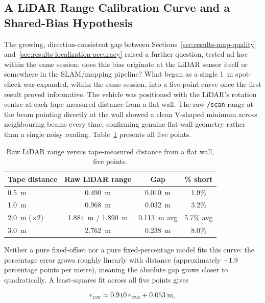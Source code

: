 \subsection{A LiDAR Range Calibration Curve and a Shared-Bias Hypothesis}
\label{sec:results-lidar-bias}

The growing, direction-consistent gap between Sections~\ref{sec:results-map-quality}
and~\ref{sec:results-localization-accuracy} raised a further question,
tested ad hoc within the same session: does this bias originate at the
LiDAR sensor itself or somewhere in the SLAM/mapping pipeline? What
began as a single \SI{1}{\meter} spot-check was expanded, within the
same session, into a five-point curve once the first result proved
informative. The vehicle was positioned with the LiDAR's rotation
centre at each tape-measured distance from a flat wall. The raw
\texttt{/scan} range at the beam pointing directly at the wall showed
a clean V-shaped minimum across neighbouring beams every time,
confirming genuine flat-wall geometry rather than a single noisy
reading. Table~\ref{tab:results-lidar-curve} presents all five points.

\begin{table}[htbp]
  \centering
  \caption{Raw LiDAR range versus tape-measured distance from a flat wall, five points.}
  \label{tab:results-lidar-curve}
  \begin{tabular}{@{}lccc@{}}
    \toprule
    Tape distance & Raw LiDAR range & Gap & \% short \\
    \midrule
    \SI{0.5}{\meter} & \SI{0.490}{\meter} & \SI{0.010}{\meter} & 1.9\% \\
    \SI{1.0}{\meter} & \SI{0.968}{\meter} & \SI{0.032}{\meter} & 3.2\% \\
    \SI{2.0}{\meter} ($\times 2$) & \SI{1.884}{\meter} / \SI{1.890}{\meter} & \SI{0.113}{\meter} avg & 5.7\% avg \\
    \SI{3.0}{\meter} & \SI{2.762}{\meter} & \SI{0.238}{\meter} & 8.0\% \\
    \bottomrule
  \end{tabular}
\end{table}

Neither a pure fixed-offset nor a pure fixed-percentage model fits
this curve: the percentage error grows roughly linearly with distance
(approximately $+1.9$ percentage points per metre), meaning the
absolute gap grows closer to quadratically. A least-squares fit across
all five points gives

\begin{equation}
  r_{\text{raw}} \approx 0.910 \, r_{\text{true}} + \SI{0.053}{\meter},
  \label{eq:lidar-bias-fit}
\end{equation}

